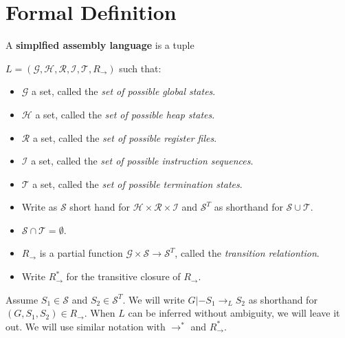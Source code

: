\section{Formal Definition}

\begin{definition}
  A \textbf{simplfied assembly language} is a tuple

  $L = (\mathcal{G}, \mathcal{H}, \mathcal{R}, \mathcal{I}, \mathcal{T}, R_\to)$
  such that:

  \begin{itemize}
  \item $\mathcal{G}$ a set, called the \emph{set of possible global states}.
  \item $\mathcal{H}$ a set, called the \emph{set of possible heap states}.
  \item $\mathcal{R}$ a set, called the \emph{set of possible register files}.
  \item $\mathcal{I}$ a set, called the \emph{set of possible instruction
      sequences}.
  \item $\mathcal{T}$ a set, called the \emph{set of possible termination
      states}.
  \item Write as $\mathcal{S}$ short hand for
    $\mathcal{H} \times \mathcal{R} \times \mathcal{I}$ and $\mathcal{S}^T$ as
    shorthand for $\mathcal{S} \cup \mathcal{T}$.
  \item $\mathcal{S} \cap \mathcal{T} = \emptyset$.
  \item $R_\to$ is a partial function
    $\mathcal{G} \times \mathcal{S} \to \mathcal{S}^T$,
    called the \emph{transition relationtion}.
  \item Write $R_\to^\ast$ for the transitive closure of $R_\to$.
  \end{itemize}

  Assume $S_1 \in \mathcal{S}$ and $S_2 \in \mathcal{S}^T$. We will write
  $G |- S_1 \to_L S_2$ as shorthand for $(G, S_1, S_2) \in R_\to$.  When $L$ can
  be inferred without ambiguity, we will leave it out. We will use similar
  notation with $\to^\ast$ and $R_\to^\ast$.
\end{definition}

